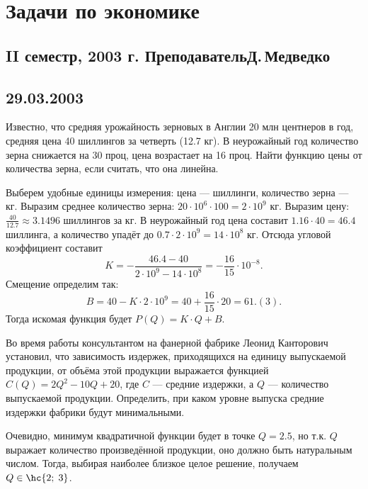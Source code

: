 \documentclass[a4paper]{article}
\begin{document}
\section*{Задачи по экономике}

\subsection*{II семестр, 2003 г. Преподаватель\т Д.\,Медведко}

\subsection*{29.03.2003}

\begin{problem}
Известно, что средняя урожайность зерновых в Англии
20 млн центнеров в год, средняя цена 40 шиллингов за четверть
(12.7 кг). В неурожайный год количество зерна
снижается на 30 проц, цена возрастает на 16 проц. Найти функцию
цены от количества зерна, если считать, что она линейна.
\end{problem}
\begin{solution}
Выберем удобные единицы измерения: цена --- шиллинги,
количество зерна --- кг. Выразим среднее количество зерна:
$20 \cdot 10^6 \cdot 100 = 2 \cdot 10^9$ кг. Выразим цену:
$\frac{40}{12.7} \approx 3.1496$ шиллингов за кг. В неурожайный год
цена составит $1.16 \cdot 40=46.4$ шиллинга, а количество упадёт
до $0.7 \cdot 2 \cdot 10^9 = 14 \cdot 10^8$ кг. Отсюда угловой коэффициент
составит $$K=-\frac{46.4-40}{2\cdot 10^9-14 \cdot 10^8} = -\frac{16}{15}\cdot 10^{-8}.$$
Смещение определим так:
$$B=40 - K\cdot 2 \cdot 10^9=40+\frac{16}{15}\cdot 20 = 61.(3).$$
Тогда искомая функция будет $P(Q)=K\cdot Q+B$.
\end{solution}

\begin{problem}
Во время работы консультантом на фанерной фабрике Леонид Канторович
установил, что зависимость издержек, приходящихся на единицу выпускаемой
продукции, от объёма этой продукции выражается функцией $C(Q) = 2Q^2 - 10Q + 20$,
где $C$ --- средние издержки, а $Q$ --- количество выпускаемой продукции.
Определить, при каком уровне выпуска средние издержки фабрики будут минимальными.
\end{problem}
\begin{solution}
Очевидно, минимум квадратичной функции будет в точке $Q=2.5$, но т.к. $Q$ выражает
количество произведённой продукции, оно должно быть натуральным числом. Тогда, выбирая
наиболее близкое целое решение, получаем $Q \in \hc{2;\;3}$.
\end{solution}
\end{document}
